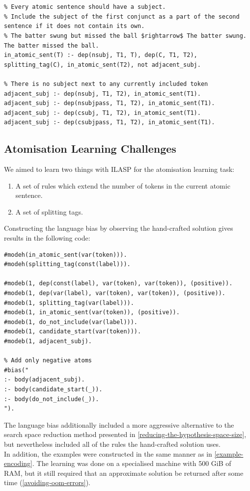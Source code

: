 \begin{lstlisting}
 

% Every atomic sentence should have a subject.
% Include the subject of the first conjunct as a part of the second sentence if it does not contain its own.
% The batter swung but missed the ball $rightarrow$ The batter swung. The batter missed the ball.
in_atomic_sent(T) :- dep(nsubj, T1, T), dep(C, T1, T2), splitting_tag(C), in_atomic_sent(T2), not adjacent_subj.

% There is no subject next to any currently included token
adjacent_subj :- dep(nsubj, T1, T2), in_atomic_sent(T1).
adjacent_subj :- dep(nsubjpass, T1, T2), in_atomic_sent(T1).
adjacent_subj :- dep(csubj, T1, T2), in_atomic_sent(T1).
adjacent_subj :- dep(csubjpass, T1, T2), in_atomic_sent(T1).
\end{lstlisting}

\subsection{Atomisation Learning Challenges}

We aimed to learn two things with ILASP for the atomisation learning task:
\begin{enumerate}
    \item A set of rules which extend the number of tokens in the current atomic sentence.
    \item A set of splitting tags.
\end{enumerate}

Constructing the language bias by observing the hand-crafted solution gives results in the following code:
\begin{verbatim}
#modeh(in_atomic_sent(var(token))).
#modeh(splitting_tag(const(label))).

#modeb(1, dep(const(label), var(token), var(token)), (positive)).
#modeb(1, dep(var(label), var(token), var(token)), (positive)).
#modeb(1, splitting_tag(var(label))).
#modeb(1, in_atomic_sent(var(token)), (positive)).
#modeb(1, do_not_include(var(label))).
#modeb(1, candidate_start(var(token))). 
#modeb(1, adjacent_subj).

% Add only negative atoms
#bias("
:- body(adjacent_subj).
:- body(candidate_start(_)).
:- body(do_not_include(_)).
").
\end{verbatim}

The language bias additionally included a more aggressive alternative to the search space reduction method presented in \ref{reducing-the-hypothesis-space-size}, but nevertheless included all of the rules the hand-crafted solution uses. \\
In addition, the examples were constructed in the same manner as in \ref{example-encoding}.
The learning was done on a specialised machine with 500 GiB of RAM, but it still required that an approximate solution be returned after some time (\ref{avoiding-oom-errors}).

